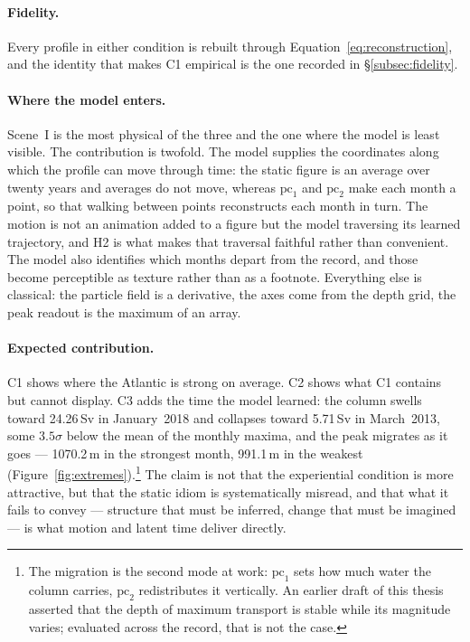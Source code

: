 \paragraph{Fidelity.} Every profile in either condition is rebuilt through Equation~\ref{eq:reconstruction}, and the identity that makes C1 empirical is the one recorded in \S\ref{subsec:fidelity}.

\paragraph{Where the model enters.} Scene~I is the most physical of the three and the one where the model is least visible. The contribution is twofold. The model supplies the coordinates along which the profile can move through time: the static figure is an average over twenty years and averages do not move, whereas $\mathrm{pc}_1$ and $\mathrm{pc}_2$ make each month a point, so that walking between points reconstructs each month in turn. The motion is not an animation added to a figure but the model traversing its learned trajectory, and H2 is what makes that traversal faithful rather than convenient. The model also identifies which months depart from the record, and those become perceptible as texture rather than as a footnote. Everything else is classical: the particle field is a derivative, the axes come from the depth grid, the peak readout is the maximum of an array.
 
\paragraph{Expected contribution.} C1 shows where the Atlantic is strong on average. C2 shows what C1 contains but cannot display. C3 adds the time the model learned: the column swells toward 24.26\,Sv in January~2018 and collapses toward 5.71\,Sv in March~2013, some $3.5\sigma$ below the mean of the monthly maxima, and the peak migrates as it goes --- 1070.2\,m in the strongest month, 991.1\,m in the weakest (Figure~\ref{fig:extremes}).\footnote{The migration is the second mode at work: $\mathrm{pc}_1$ sets how much water the column carries, $\mathrm{pc}_2$ redistributes it vertically. An earlier draft of this thesis asserted that the depth of maximum transport is stable while its magnitude varies; evaluated across the record, that is not the case.} The claim is not that the experiential condition is more attractive, but that the static idiom is systematically misread, and that what it fails to convey --- structure that must be inferred, change that must be imagined --- is what motion and latent time deliver directly.
 
